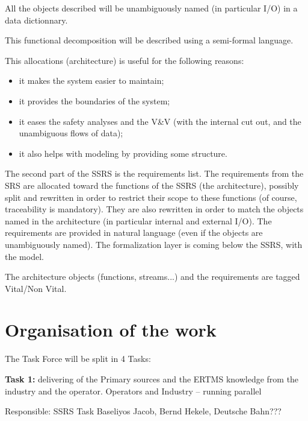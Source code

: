 \documentclass{template/openetcs_article}
\begin{document}
All the objects described will be unambiguously named (in particular I/O) in a data dictionnary. 

This functional decomposition will be described using a semi-formal language.

This allocations (architecture) is useful for the following reasons:
 
\begin{itemize}
\item	it makes the system easier to maintain;
\item	it provides the boundaries of the system;
\item	it eases the safety analyses and the V\&V (with the internal cut out, and the unambiguous flows of data);
\item	it also helps  with modeling by providing some structure.
\end{itemize}
The second part of the SSRS is the requirements list. The requirements from the SRS are allocated toward the functions of the SSRS (the architecture), possibly split and rewritten in order to restrict their scope to these functions (of course, traceability is mandatory). They are also rewritten in order to match the objects named in the architecture (in particular internal and external I/O). The requirements are provided in natural language (even if the objects are unambiguously named). The formalization layer is coming below the SSRS, with the model.
 
The architecture objects (functions, streams...) and the requirements are tagged Vital/Non Vital.

\section{Organisation of the work}
The Task Force will be split in 4 Tasks:

\textbf{Task 1:} delivering of the Primary sources and the ERTMS knowledge from the industry and the operator. 
Operators and Industry – running parallel

Responsible: SSRS Task Baseliyos Jacob, Bernd Hekele, Deutsche Bahn???
\end{document}
